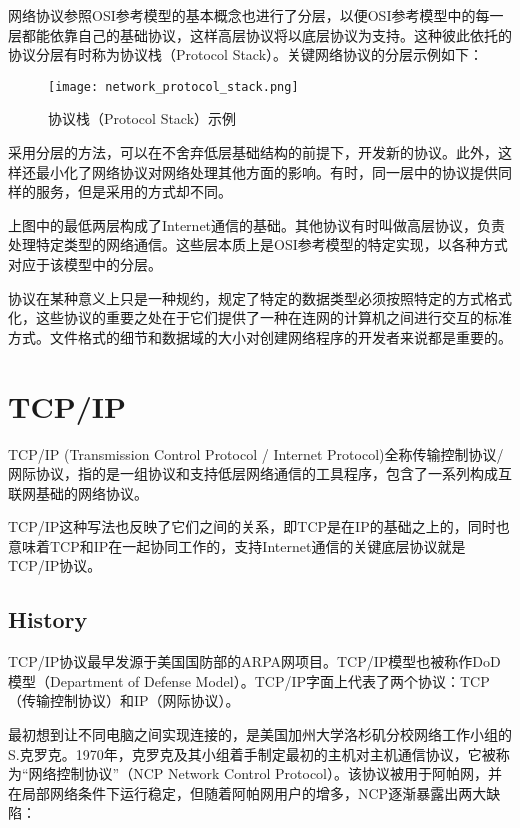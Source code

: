网络协议参照OSI参考模型的基本概念也进行了分层，以便OSI参考模型中的每一层都能依靠自己的基础协议，这样高层协议将以底层协议为支持。这种彼此依托的协议分层有时称为协议栈（Protocol Stack）。关键网络协议的分层示例如下：


\begin{figure}[!h]
\centering
\texttt{[image: network\_protocol\_stack.png]}
\caption{协议栈（Protocol Stack）示例}
\label{network_protocol_stack}
\end{figure}


采用分层的方法，可以在不舍弃低层基础结构的前提下，开发新的协议。此外，这样还最小化了网络协议对网络处理其他方面的影响。有时，同一层中的协议提供同样的服务，但是采用的方式却不同。


上图中的最低两层构成了Internet通信的基础。其他协议有时叫做高层协议，负责处理特定类型的网络通信。这些层本质上是OSI参考模型的特定实现，以各种方式对应于该模型中的分层。


协议在某种意义上只是一种规约，规定了特定的数据类型必须按照特定的方式格式化，这些协议的重要之处在于它们提供了一种在连网的计算机之间进行交互的标准方式。文件格式的细节和数据域的大小对创建网络程序的开发者来说都是重要的。



\chapter{TCP/IP}


TCP/IP (Transmission Control Protocol / Internet Protocol)全称传输控制协议/网际协议\cite{tcp_ip}，指的是一组协议和支持低层网络通信的工具程序，包含了一系列构成互联网基础的网络协议。

TCP/IP这种写法也反映了它们之间的关系，即TCP是在IP的基础之上的，同时也意味着TCP和IP在一起协同工作的，支持Internet通信的关键底层协议就是TCP/IP协议。



\section{History}


TCP/IP协议最早发源于美国国防部的ARPA网项目。TCP/IP模型也被称作DoD模型（Department of Defense Model）。TCP/IP字面上代表了两个协议：TCP（传输控制协议）和IP（网际协议）。

最初想到让不同电脑之间实现连接的，是美国加州大学洛杉矶分校网络工作小组的S.克罗克。1970年，克罗克及其小组着手制定最初的主机对主机通信协议，它被称为“网络控制协议”（NCP Network Control Protocol）。该协议被用于阿帕网，并在局部网络条件下运行稳定，但随着阿帕网用户的增多，NCP逐渐暴露出两大缺陷：

